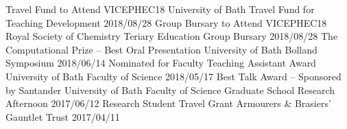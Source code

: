 \begin{cvpubs}
  \cvpub
    {Travel Fund to Attend VICEPHEC18}
    {University of Bath Travel Fund for Teaching Development}
    {2018/08/28}
  \cvpub
    {Group Bursary to Attend VICEPHEC18}
    {Royal Society of Chemistry Teriary Education Group Bursary}
    {2018/08/28}
  \cvpub
    {The Computational Prize -- Best Oral Presentation}
    {University of Bath Bolland Symposium}
    {2018/06/14}
  \cvpub
    {Nominated for Faculty Teaching Assistant Award}
    {University of Bath Faculty of Science}
    {2018/05/17}
  \cvpub
    {Best Talk Award -- Sponsored by Santander}
    {University of Bath Faculty of Science Graduate School Research Afternoon}
    {2017/06/12}
  \cvpub
  	{Research Student Travel Grant}
    {Armourers \& Brasiers' Gauntlet Trust}
    {2017/04/11}
\end{cvpubs}
